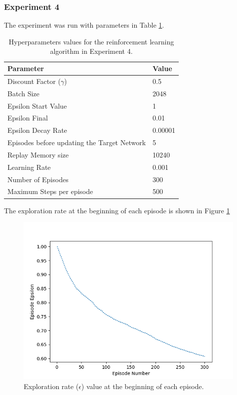 \documentclass[12pt,oneside]{article}
\begin{document}
\subsubsection{Experiment 4}\label{experiment:experiment-4}
The experiment was run with parameters in Table \ref{tab:hyperparams-exp-4}.
\begin{table}[H]
\centering
\begin{tabular}{l l}
\hline
Parameter & Value \\
\hline
Discount Factor ($\gamma$) & 0.5 \\
Batch Size & 2048 \\
Epsilon Start Value & 1 \\
Epsilon Final & 0.01 \\
Epsilon Decay Rate & 0.00001 \\
Episodes before updating the Target Network & 5 \\
Replay Memory size & 10240 \\
Learning Rate & 0.001 \\
Number of Episodes & 300 \\
Maximum Steps per episode & 500 \\
\hline
\end{tabular}
\caption{Hyperparameters values for the reinforcement learning algorithm in Experiment 4.}
\label{tab:hyperparams-exp-4}
\end{table}
The exploration rate at the beginning of each episode is shown in Figure \ref{fig:epsilon_episodes_300_gamma_05}
\begin{figure}[H]
\centering
\includegraphics[width=0.9\linewidth]{epsilon_episodes_300_gamma_05.png}
\caption{Exploration rate ($\epsilon$) value at the beginning of each episode. }
\label{fig:epsilon_episodes_300_gamma_05}
\end{figure}
\end{document}
